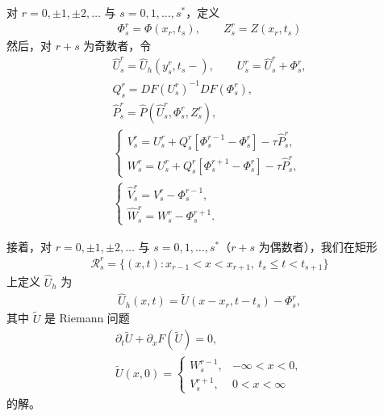 ﻿\documentclass[../../main.tex]{subfiles}
\begin{document}
对 $r=0,\pm1,\pm2,\ldots$ 与 $s=0,1,\ldots,s^*$，定义
\begin{align}
\Phi_s^r=\Phi(x_r,t_s),\qquad Z_s^r=Z(x_r,t_s)
\label{align:ch16-s04-e03}
\end{align}
然后，对 $r+s$ 为奇数者，令
\begin{align}
\hat U_s^r=\hat U_h(y_s^r,t_s-),\qquad U_s^r=\hat U_s^r+\Phi_s^r,
\label{align:ch16-s04-e04}\\
Q_s^r=DF(U_s^r)^{-1}DF(\Phi_s^r),
\label{align:ch16-s04-e05}\\
\hat P_s^r=\hat P(\hat U_s^r,\Phi_s^r,Z_s^r),
\label{align:ch16-s04-e06}\\
\begin{cases}
V_s^r=U_s^r+Q_s^r[\Phi_s^{r-1}-\Phi_s^r]-\tau\hat P_s^r,\\
W_s^r=U_s^r+Q_s^r[\Phi_s^{r+1}-\Phi_s^r]-\tau\hat P_s^r,
\end{cases}
\label{align:ch16-s04-e07}\\
\begin{cases}
\hat V_s^r=V_s^r-\Phi_s^{r-1},\\
\hat W_s^r=W_s^r-\Phi_s^{r+1}.
\end{cases}
\label{align:ch16-s04-e08}
\end{align}

接着，对 $r=0,\pm1,\pm2,\ldots$ 与 $s=0,1,\ldots,s^*$（$r+s$ 为偶数者），我们在矩形
\begin{align}
\mathscr{R}_s^r=\{(x,t):x_{r-1}<x<x_{r+1},\ t_s\leqslant t<t_{s+1}\}
\label{align:ch16-s04-e09}
\end{align}
上定义 $\hat U_h$ 为
\begin{align}
\hat U_h(x,t)=\tilde U(x-x_r,t-t_s)-\Phi_s^r,
\label{align:ch16-s04-e10}
\end{align}
其中 $\tilde U$ 是 Riemann 问题
\begin{align}
\partial_t\tilde U+\partial_xF(\tilde U)=0,
\label{align:ch16-s04-e11}\\
\tilde U(x,0)=
\begin{cases}
W_s^{r-1},&-\infty<x<0,\\
V_s^{r+1},&0<x<\infty
\end{cases}
\label{align:ch16-s04-e12}
\end{align}
的解。
\end{document}

